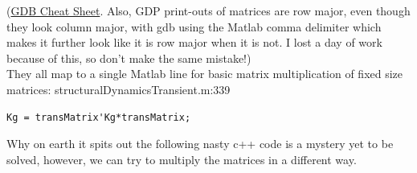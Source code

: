\documentclass{article}
\begin{document}
(\href{https://darkdust.net/files/GDB\%20Cheat\%20Sheet.pdf}{GDB Cheat Sheet}. Also, GDP print-outs of matrices are row major, even though they look column major, with gdb using the Matlab comma delimiter which makes it further look like it is row major when it is not. I lost a day of work because of this, so don't make the same mistake!) \\

They all map to a single Matlab line for basic matrix multiplication of fixed size matrices:
structuralDynamicsTransient.m:339

\begin{verbatim}
Kg = transMatrix'Kg*transMatrix;
\end{verbatim}

\noindent Why on earth it spits out the following nasty c++ code is a mystery yet to be solved, however, we can try to multiply the matrices in a different way.
\end{document}
